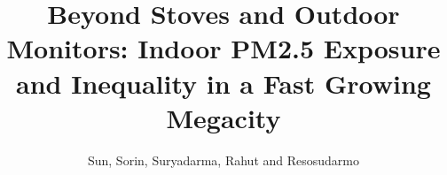 \documentclass[9pt,twoside]{pnas-new}
\title{Beyond Stoves and Outdoor Monitors: Indoor PM2.5 Exposure and Inequality in a Fast Growing Megacity}
\author{Sun, Sorin, Suryadarma, Rahut and Resosudarmo}
\begin{document}
\maketitle

\renewcommand{\thefigure}{S\arabic{figure}}
\renewcommand{\thetable}{S\arabic{table}}







\newpage
\end{document}
